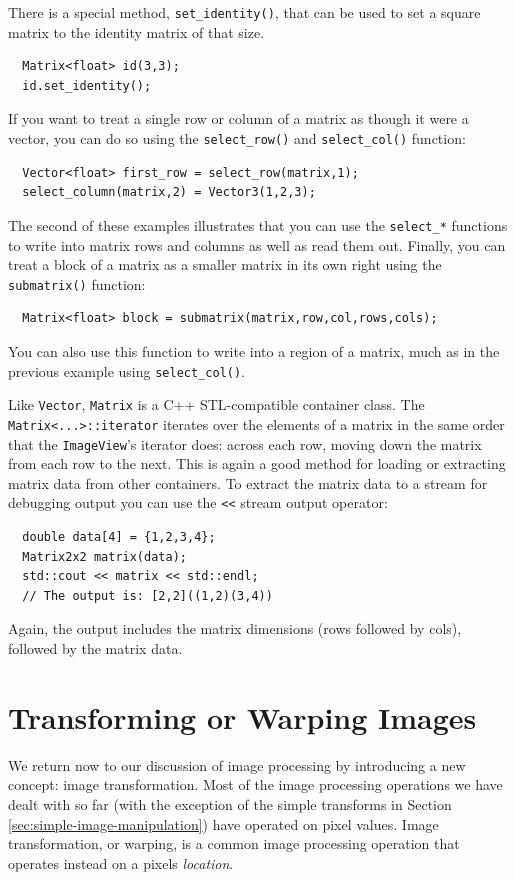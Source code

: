 There is a special method, \verb#set_identity()#, that can be used 
to set a square matrix to the identity matrix of that size.
\begin{verbatim}
  Matrix<float> id(3,3);
  id.set_identity();
\end{verbatim}
If you want to treat a single row or column of a matrix as though 
it were a vector, you can do so using the \verb#select_row()# and 
\verb#select_col()# function:
\begin{verbatim}
  Vector<float> first_row = select_row(matrix,1);
  select_column(matrix,2) = Vector3(1,2,3);
\end{verbatim}
The second of these examples illustrates that you can use the 
\verb#select_*# functions to write into matrix rows and 
columns as well as read them out.  Finally, you can treat 
a block of a matrix as a smaller matrix in its own right 
using the \verb#submatrix()# function:
\begin{verbatim}
  Matrix<float> block = submatrix(matrix,row,col,rows,cols);
\end{verbatim}
You can also use this function to write into a region of a 
matrix, much as in the previous example using \verb#select_col()#.

Like \verb#Vector#, \verb#Matrix# is a C++ STL-compatible 
container class.  The \verb#Matrix<...>::iterator# iterates 
over the elements of a matrix in the same order that the 
\verb#ImageView#'s iterator does: across each row, moving 
down the matrix from each row to the next.  This is again a 
good method for loading or extracting matrix data from other 
containers.  To extract the matrix data to a stream for 
debugging output you can use the \verb#<<# stream output 
operator:
\begin{verbatim}
  double data[4] = {1,2,3,4};
  Matrix2x2 matrix(data);
  std::cout << matrix << std::endl;
  // The output is: [2,2]((1,2)(3,4))
\end{verbatim}
Again, the output includes the matrix dimensions (rows 
followed by cols), followed by the matrix data.

\section{Transforming or Warping Images}

We return now to our discussion of image processing by introducing a
new concept: image transformation.  Most of the image processing
operations we have dealt with so far (with the exception of the simple
transforms in Section \ref {sec:simple-image-manipulation}) have
operated on pixel values.  Image transformation, or warping, is a
common image processing operation that operates instead on a pixels
{\em location}.

